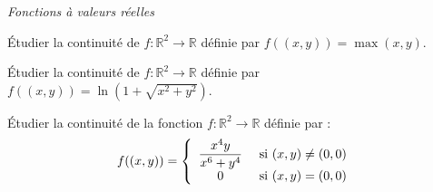 \documentclass[a4paper,10pt]{report}
\begin{document}
\begin{center}
\textit{{ {\large Fonctions à valeurs réelles}}}
\end{center}

\medskip



\begin{Exa} Étudier la continuité de $f : \mathbb{R}^2 \rightarrow \mathbb{R}$ définie par $ f((x,y))=  \max(x,y)$.
\end{Exa}


\begin{Exa} Étudier la continuité de $f : \mathbb{R}^2 \rightarrow \mathbb{R}$ définie par $f((x,y))= \ln(1 + \sqrt{x^2+y^2})$.
\end{Exa}


\begin{Exa} Étudier la continuité de la fonction $f : \mathbb{R}^2 \rightarrow \mathbb{R}$ définie par :
$$ f((x,y)) = \left\lbrace \begin{array}{cl}
\dfrac{x^4 y}{x^6+y^4} & \hbox{ si } (x,y) \neq (0,0) \\
0 & \hbox{ si } (x,y)=(0,0) \\
\end{array}\right.$$
\end{Exa}

%
%
\end{document}
